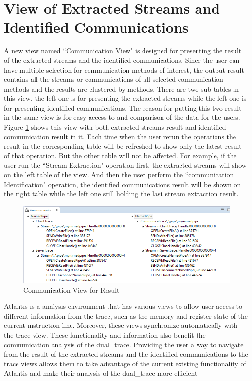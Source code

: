 \section{View of Extracted Streams and Identified Communications}
A new view named ``Communication View" is designed for presenting the result of the extracted streams and the identified communications. Since the user can have multiple selection for communication methods of interest, the output result contains all the streams or communications of all selected communication methods and the results are clustered by methods. There are two sub tables in this view, the left one is for presenting the extracted streams while the left one is for presenting identified communications. The reason for putting this two result in the same view is for easy access to and comparison of the data for the users. Figure \ref{idenview} shows this view with both extracted streams result and identified communication result in it. Each time when the user rerun the operations the result in the corresponding table will be refreshed to show only the latest result of that operation. But the other table will not be affected. For example, if the user run the ``Stream Extraction" operation first, the extracted streams will show on the left table of the view. And then the user perform the ``communication Identification" operation, the identified communications result will be shown on the right table while the left one still holding the last stream extraction result.

\begin{figure}[H]
\centerline{\includegraphics[scale=0.7]{Figures/idenview}}
 \caption{Communication View for Result}
\label{idenview}
\end{figure}

Atlantis is a analysis environment that has various views to allow user access to different information from the trace, such as the memory and register state of the current instruction line. Moreover, these views synchronize automatically with the trace view. These functionality and information also benefit the communication analysis of the dual\_trace. Providing the user a way to navigate from the result of the extracted streams and the identified communications to the trace views allows them to take advantage of the current existing functionality of Atlantis and make their analysis of the dual\_trace more efficient.

